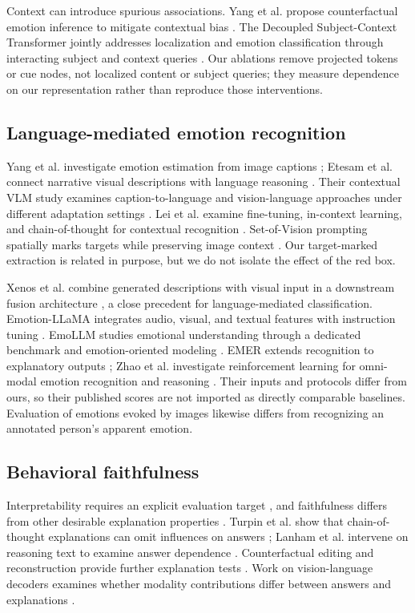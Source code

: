 \documentclass[conference]{IEEEtran}
\begin{document}
Context can introduce spurious associations. Yang et al. propose counterfactual emotion inference to mitigate contextual bias \cite{debias}. The Decoupled Subject-Context Transformer jointly addresses localization and emotion classification through interacting subject and context queries \cite{decoupled}. Our ablations remove projected tokens or cue nodes, not localized content or subject queries; they measure dependence on our representation rather than reproduce those interventions.

\subsection{Language-mediated emotion recognition}
Yang et al. investigate emotion estimation from image captions \cite{captions}; Etesam et al. connect narrative visual descriptions with language reasoning \cite{etom}. Their contextual VLM study examines caption-to-language and vision-language approaches under different adaptation settings \cite{contextvlm}. Lei et al. examine fine-tuning, in-context learning, and chain-of-thought for contextual recognition \cite{lei}. Set-of-Vision prompting spatially marks targets while preserving image context \cite{visualprompt}. Our target-marked extraction is related in purpose, but we do not isolate the effect of the red box.

Xenos et al. combine generated descriptions with visual input in a downstream fusion architecture \cite{commonsense}, a close precedent for language-mediated classification. Emotion-LLaMA integrates audio, visual, and textual features with instruction tuning \cite{emotionllama}. EmoLLM studies emotional understanding through a dedicated benchmark and emotion-oriented modeling \cite{emollm}. EMER extends recognition to explanatory outputs \cite{emer}; Zhao et al. investigate reinforcement learning for omni-modal emotion recognition and reasoning \cite{r1omni}. Their inputs and protocols differ from ours, so their published scores are not imported as directly comparable baselines. Evaluation of emotions evoked by images \cite{evaluatevlm} likewise differs from recognizing an annotated person's apparent emotion.

\subsection{Behavioral faithfulness}
Interpretability requires an explicit evaluation target \cite{interpretability}, and faithfulness differs from other desirable explanation properties \cite{faithfulness}. Turpin et al. show that chain-of-thought explanations can omit influences on answers \cite{turpin}; Lanham et al. intervene on reasoning text to examine answer dependence \cite{lanham}. Counterfactual editing and reconstruction provide further explanation tests \cite{faithfulnesstests}. Work on vision-language decoders examines whether modality contributions differ between answers and explanations \cite{decoderfaithfulness}.
\end{document}
